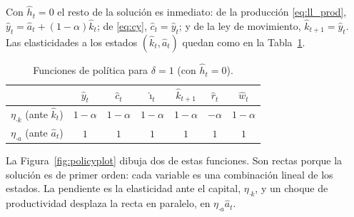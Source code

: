 \documentclass[11pt,a4paper]{report}
\begin{document}
Con $\hat{h}_t=0$ el resto de la solución es inmediato: de la producción
\eqref{eq:ll_prod}, $\hat{y}_t=\hat{a}_t+(1-\alpha)\hat{k}_t$; de \eqref{eq:cy},
$\hat{c}_t=\hat{y}_t$; y de la ley de movimiento, $\hat{k}_{t+1}=\hat{y}_t$. Las
elasticidades a los estados $(\hat{k}_t,\hat{a}_t)$ quedan como en la
Tabla~\ref{tab:policy}.

\begin{table}[H]
\centering\small
\begin{tabular}{ccccccc}
\toprule
 & $\hat{y}_t$ & $\hat{c}_t$ & $\hat{\imath}_t$ & $\hat{k}_{t+1}$ & $\hat{r}_t$ & $\hat{w}_t$ \\
\midrule
$\eta_{\cdot k}$ (ante $\hat{k}_t$) & $1-\alpha$ & $1-\alpha$ & $1-\alpha$ & $1-\alpha$ & $-\alpha$ & $1-\alpha$ \\
$\eta_{\cdot a}$ (ante $\hat{a}_t$) & $1$ & $1$ & $1$ & $1$ & $1$ & $1$ \\
\bottomrule
\end{tabular}
\caption{Funciones de política para $\delta=1$ (con $\hat{h}_t=0$).}
\label{tab:policy}
\end{table}

\noindent La Figura~\ref{fig:policyplot} dibuja dos de estas funciones. Son rectas
porque la solución es de primer orden: cada variable es una combinación lineal de los
estados. La pendiente es la elasticidad ante el capital, $\eta_{\cdot k}$, y un choque
de productividad desplaza la recta en paralelo, en $\eta_{\cdot a}\hat{a}_t$.
\end{document}
